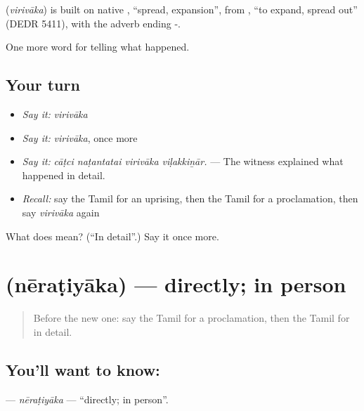 \begin{cousinweb}
\textbf{} (\emph{virivāka}) is built on native , \textquotedblleft{}spread, expansion\textquotedblright{}, from , \textquotedblleft{}to expand, spread out\textquotedblright{} (DEDR 5411), with the adverb ending -.
\end{cousinweb}

\begin{grammarlens}[title={What you've built}]
One more word for telling what happened.
\end{grammarlens}

\subsection*{Your turn}
\begin{itemize}
\raggedright
  \item \emph{Say it:} \emph{virivāka}
  \item \emph{Say it:} \emph{virivāka}, once more
  \item \emph{Say it:} \emph{cāṭci naṭantatai virivāka viḷakkiṉār.} — The witness explained what happened in detail.
  \item \emph{Recall:} say the Tamil for an uprising, then the Tamil for a proclamation, then say \emph{virivāka} again
\end{itemize}

\begin{tcolorbox}[breakable,colback=teal!4,colframe=teal!35!black,title={Before you move on}]
What does  mean? (\textquotedblleft{}In detail\textquotedblright{}.) Say it once more.
\end{tcolorbox}
\section[\texorpdfstring{\ta{நேரடியாக} (nēraṭiyāka)}{நேரடியாக (nēraṭiyāka)}]{ (nēraṭiyāka) — directly; in person}

\label{lesson:TA-C312-neratiyaka}



\begin{quote}
Before the new one: say the Tamil for a proclamation, then the Tamil for in detail.
\end{quote}

\subsection*{You'll want to know: }
\textbf{} — \emph{nēraṭiyāka} — \textquotedblleft{}directly; in person\textquotedblright{}.


